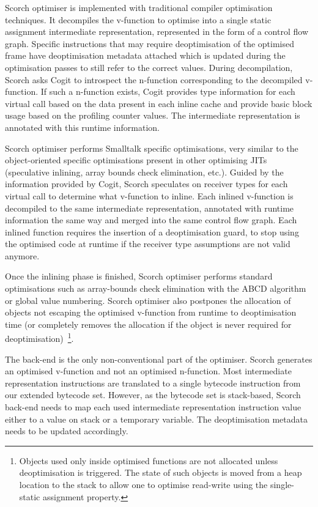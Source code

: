 \documentclass[a4paper,12pt,twoside]{../includes/ThesisStyle}
\begin{document}
Scorch optimiser is implemented with traditional compiler optimisation techniques. It decompiles the v-function to optimise into a single static assignment intermediate representation, represented in the form of a control flow graph. Specific instructions that may require deoptimisation of the optimised frame have deoptimisation metadata attached which is updated during the optimisation passes to still refer to the correct values. During decompilation, Scorch asks Cogit to introspect the n-function corresponding to the decompiled v-function. If such a n-function exists, Cogit provides type information for each virtual call based on the data present in each inline cache and provide basic block usage based on the profiling counter values. The intermediate representation is annotated with this runtime information.


Scorch optimiser performs Smalltalk specific optimisations, very similar to the object-oriented specific optimisations present in other optimising JITs (speculative inlining, array bounds check elimination, etc.). Guided by the information provided by Cogit, Scorch speculates on receiver types for each virtual call to determine what v-function to inline. Each inlined v-function is decompiled to the same intermediate representation, annotated with runtime information the same way and merged into the same control flow graph. Each inlined function requires the insertion of a deoptimisation guard, to stop using the optimised code at runtime if the receiver type assumptions are not valid anymore. 

Once the inlining phase is finished, Scorch optimiser performs standard optimisations such as array-bounds check elimination with the ABCD algorithm~\cite{Bodi00a} or global value numbering. Scorch optimiser also postpones the allocation of objects not escaping the optimised v-function from runtime to deoptimisation time (or completely removes the allocation if the object is never required for deoptimisation)~\footnote{Objects used only inside optimised functions are not allocated unless deoptimisation is triggered. The state of such objects is moved from a heap location to the stack to allow one to optimise read-write using the single-static assignment property.}.

The back-end is the only non-conventional part of the optimiser. Scorch generates an optimised v-function and not an optimised n-function. Most intermediate representation instructions are translated to a single bytecode instruction from our extended bytecode set. However, as the bytecode set is stack-based, Scorch back-end needs to map each used intermediate representation instruction value either to a value on stack or a temporary variable. The deoptimisation metadata needs to be updated accordingly.
\end{document}
